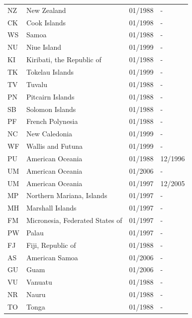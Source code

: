 \begin{footnotesize}
\begin{longtable}{p{0.5cm}p{9cm}p{2cm}p{2cm}}
NZ	&	New Zealand	&	01/1988	&	-	\\

CK	&	Cook Islands	&	01/1998	&	-	\\

WS	&	Samoa	&	01/1988	&	-	\\

NU	&	Niue Island	&	01/1999	&	-	\\

KI	&	Kiribati, the Republic of	&	01/1988	&	-	\\

TK	&	Tokelau Islands	&	01/1999	&	-	\\

TV	&	Tuvalu	&	01/1988	&	-	\\

PN	&	Pitcairn Islands	&	01/1988	&	-	\\

SB	&	Solomon Islands	&	01/1988	&	-	\\

PF	&	French Polynesia	&	01/1988	&	-	\\

NC	&	New Caledonia	&	01/1999	&	-	\\

WF	&	Wallis and Futuna	&	01/1999	&	-	\\

PU	&	American Oceania	&	01/1988	&	12/1996	\\

UM	&	American Oceania	&	01/2006	&	-	\\

UM	&	American Oceania	&	01/1997	&	12/2005	\\

MP	&	Northern Mariana, Islands	&	01/1997	&	-	\\

MH	&	Marshall Islands	&	01/1997	&	-	\\

FM	&	Micronesia, Federated States of	&	01/1997	&	-	\\

PW	&	Palau	&	01/1997	&	-	\\

FJ	&	Fiji, Republic of	&	01/1988	&	-	\\

AS	&	American Samoa	&	01/2006	&	-	\\

GU	&	Guam	&	01/2006	&	-	\\

VU	&	Vanuatu	&	01/1988	&	-	\\

NR	&	Nauru	&	01/1988	&	-	\\

TO	&	Tonga	&	01/1988	&	-	\\

\end{longtable}
\end{footnotesize}

